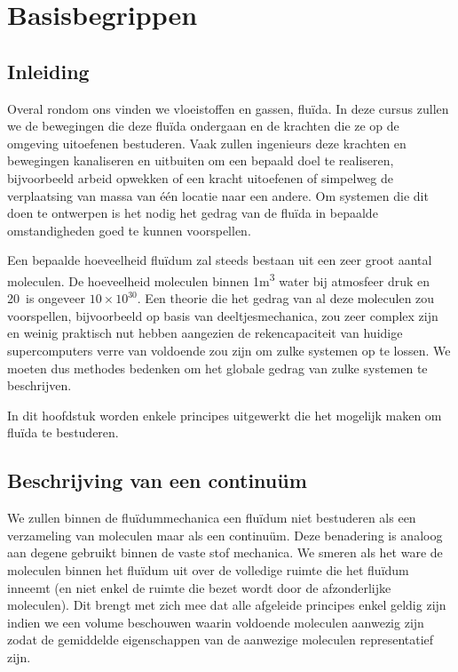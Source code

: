 \chapter{Basisbegrippen}
\label{sec:Basisbegrippen}

	\section{Inleiding}
	\label{sec:Basisbegrippen Inleiding}
Overal rondom ons vinden we vloeistoffen en gassen, fluïda. In deze cursus zullen we de bewegingen die deze fluïda ondergaan en de krachten die ze op de omgeving uitoefenen bestuderen. Vaak zullen ingenieurs deze krachten en bewegingen kanaliseren en uitbuiten om een bepaald doel te realiseren, bijvoorbeeld arbeid opwekken of een kracht uitoefenen of simpelweg de verplaatsing van massa van één locatie naar een andere. Om systemen die dit doen te ontwerpen is het nodig het gedrag van de fluïda in bepaalde omstandigheden goed te kunnen voorspellen.

Een bepaalde hoeveelheid fluïdum zal steeds bestaan uit een zeer groot aantal moleculen. De hoeveelheid moleculen binnen 1\unit{m^3} water bij atmosfeer druk en 20\degC\ is ongeveer $10\times10^{30}$. Een theorie die het gedrag van al deze moleculen zou voorspellen, bijvoorbeeld op basis van deeltjesmechanica, zou zeer complex zijn en weinig praktisch nut hebben aangezien de rekencapaciteit van huidige supercomputers verre van voldoende zou zijn om zulke systemen op te lossen. We moeten dus methodes bedenken om het globale gedrag van zulke systemen te beschrijven.

In dit hoofdstuk worden enkele principes uitgewerkt die het mogelijk maken om fluïda te bestuderen.
	
	\section{Beschrijving van een continuüm}
	\label{sec:Beschrijving van een continuum}	
We zullen binnen de fluïdummechanica een fluïdum niet bestuderen als een verzameling van moleculen maar als een continuüm. Deze benadering is analoog aan degene gebruikt binnen de vaste stof mechanica. We smeren als het ware de moleculen binnen het fluïdum uit over de volledige ruimte die het fluïdum inneemt (en niet enkel de ruimte die bezet wordt door de afzonderlijke moleculen). Dit brengt met zich mee dat alle afgeleide principes enkel geldig zijn indien we een volume beschouwen waarin voldoende moleculen aanwezig zijn zodat de gemiddelde eigenschappen van de aanwezige moleculen representatief zijn.

